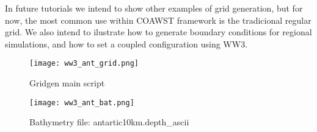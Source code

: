 \noindent In future tutorials we intend to show other examples of grid generation, but for now, the most common use within COAWST framework is the tradicional regular 
grid. We also intend to ilustrate how to generate boundary conditions for regional simulations, and how to set a coupled configuration using WW3.  
\bigskip

\begin{figure} [!htb] 
\centering
\texttt{[image: ww3\_ant\_grid.png]}
\caption{Gridgen main script}
\label{fig1}
\end{figure}


\begin{figure} [!htb] 
\centering
\texttt{[image: ww3\_ant\_bat.png]}
\caption{Bathymetry file: antartic10km.depth\_ascii}
\label{fig2}
\end{figure}

